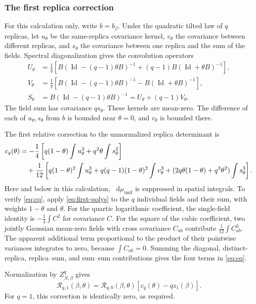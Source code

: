 \documentclass[11pt,reqno]{amsart}
\numberwithin{equation}{section}
\theoremstyle{plain}
\theoremstyle{definition}
\newcommand{\dd}{\mathop{}\!\mathrm d}
\newcommand{\Id}{\operatorname{Id}}
\newcommand{\be}{\beta}
\newcommand{\muunif}{\mu_{\mathrm{unif}}}
\begin{document}
\subsubsection{The first replica correction}
For this calculation only, write $b=b_\be$. Under the quadratic tilted law of $q$ replicas, let $u_\theta$ be the same-replica covariance kernel, $v_\theta$ the covariance between different replicas, and $s_\theta$ the covariance between one replica and the sum of the fields. Spectral diagonalization gives the convolution operators
\begin{align}
 U_\theta&=\frac1q\left[B(\Id-(q-1)\theta B)^{-1}
            +(q-1)B(\Id+\theta B)^{-1}\right],\label{eq:U}\\
 V_\theta&=\frac1q\left[B(\Id-(q-1)\theta B)^{-1}
            -B(\Id+\theta B)^{-1}\right],\label{eq:V}\\
 S_\theta&=B(\Id-(q-1)\theta B)^{-1}=U_\theta+(q-1)V_\theta.\label{eq:Sop}
\end{align}
The field sum has covariance $q s_\theta$. These kernels are mean-zero. The difference of each of $u_\theta,s_\theta$ from $b$ is bounded near $\theta=0$, and $v_\theta$ is bounded there.

The first relative correction to the unnormalized replica determinant is
\begin{align}\label{eq:cq}
 c_q(\theta)
 &=-\frac14\left[q(1-\theta)\int u_\theta^2+q^2\theta\int s_\theta^2\right]\notag\\
 &\quad+\frac1{12}\left[
 q(1-\theta)^2\int u_\theta^3
 +q(q-1)(1-\theta)^2\int v_\theta^3
 +(2q\theta(1-\theta)+q^3\theta^2)\int s_\theta^3\right].
\end{align}
Here and below in this calculation, $\dd \muunif$ is suppressed in spatial integrals. To verify \eqref{eq:cq}, apply \eqref{eq:first-polys} to the $q$ individual fields and their sum, with weights $1-\theta$ and $\theta$. For the quartic logarithmic coefficient, the single-field identity is $-\frac14\int C^2$ for covariance $C$. For the square of the cubic coefficient, two jointly Gaussian mean-zero fields with cross covariance $C_{ab}$ contribute $\frac1{12}\int C_{ab}^3$. The apparent additional term proportional to the product of their pointwise variances integrates to zero, because $\int C_{ab}=0$. Summing the diagonal, distinct-replica, replica--sum, and sum--sum contributions gives the four terms in \eqref{eq:cq}.

Normalization by $Z_{N,\be}^q$ gives
\begin{equation}\label{eq:Rq1}
 \mathcal R_{q,1}(\be,\theta)
 =\mathcal R_{q,0}(\be,\theta)[c_q(\theta)-qz_1(\be)].
\end{equation}
For $q=1$, this correction is identically zero, as required.
\end{document}
